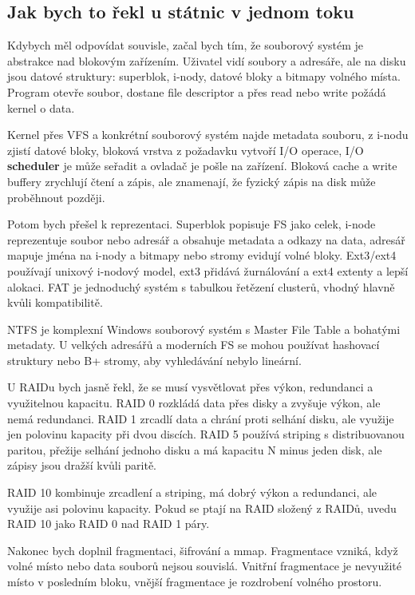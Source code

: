 \subsection*{Jak bych to řekl u státnic v jednom toku}

Kdybych měl odpovídat souvisle, začal bych tím, že souborový systém je abstrakce nad blokovým zařízením. Uživatel vidí soubory a adresáře, ale na disku jsou datové struktury: superblok, i-nody, datové bloky a bitmapy volného místa. Program otevře soubor, dostane file descriptor a přes read nebo write požádá kernel o data.

Kernel přes VFS a konkrétní souborový systém najde metadata souboru, z i-nodu zjistí datové bloky, bloková vrstva z požadavku vytvoří I/O operace, I/O \textbf{scheduler} je může seřadit a ovladač je pošle na zařízení. Bloková cache a write buffery zrychlují čtení a zápis, ale znamenají, že fyzický zápis na disk může proběhnout později.

Potom bych přešel k reprezentaci. Superblok popisuje FS jako celek, i-node reprezentuje soubor nebo adresář a obsahuje metadata a odkazy na data, adresář mapuje jména na i-nody a bitmapy nebo stromy evidují volné bloky. Ext3/ext4 používají unixový i-nodový model, ext3 přidává žurnálování a ext4 extenty a lepší alokaci. FAT je jednoduchý systém s tabulkou řetězení clusterů, vhodný hlavně kvůli kompatibilitě.

NTFS je komplexní Windows souborový systém s Master File Table a bohatými metadaty. U velkých adresářů a moderních FS se mohou používat hashovací struktury nebo B+ stromy, aby vyhledávání nebylo lineární.

U RAIDu bych jasně řekl, že se musí vysvětlovat přes výkon, redundanci a využitelnou kapacitu. RAID 0 rozkládá data přes disky a zvyšuje výkon, ale nemá redundanci. RAID 1 zrcadlí data a chrání proti selhání disku, ale využije jen polovinu kapacity při dvou discích. RAID 5 používá striping s distribuovanou paritou, přežije selhání jednoho disku a má kapacitu N minus jeden disk, ale zápisy jsou dražší kvůli paritě.

RAID 10 kombinuje zrcadlení a striping, má dobrý výkon a redundanci, ale využije asi polovinu kapacity. Pokud se ptají na RAID složený z RAIDů, uvedu RAID 10 jako RAID 0 nad RAID 1 páry.

Nakonec bych doplnil fragmentaci, šifrování a mmap. Fragmentace vzniká, když volné místo nebo data souborů nejsou souvislá. Vnitřní fragmentace je nevyužité místo v posledním bloku, vnější fragmentace je rozdrobení volného prostoru.

